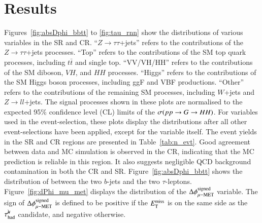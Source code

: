 

\section{Results}
    \label{sec:grav:res}
    Figures~\ref{fig:absDphi_bbtt} to \ref{fig:tau_rnn} show the distributions of various variables in the SR and CR. 
    ``$Z\rightarrow\tau\tau$+jets'' refers to the contributions of the $Z\rightarrow\tau\tau$+jets processes.
    ``Top'' refers to the contributions of the SM top quark processes, including $t\bar{t}$ and single top.
    ``VV/VH/HH'' refers to the contributions of the SM diboson, $VH$, and $HH$ processes.
    ``Higgs'' refers to the contributions of the SM Higgs boson processes, including ggF and VBF productions.
    ``Other'' refers to the contributions of the remaining SM processes, including $W$+jets and $Z\rightarrow ll$+jets.
    The signal processes shown in these plots are normalised to the expected 95\% confidence level (CL) limits of the $\sigma(pp\rightarrow G \rightarrow HH)$. 
    For variables used in the event-selection, these plots display the distributions after all other 
    event-selections have been applied, except for the variable itself. 
    The event yields in the SR and CR regions are presented in Table~\ref{tab:n_evt}. 
    Good agreement between data and MC simulation is observed in the CR, 
    indicating that the MC prediction is reliable in this region. 
    It also suggests negligible QCD background contamination in both the CR and SR.
    Figure~\ref{fig:absDphi_bbtt} shows the distribution of \absdPhibbtt between the two $b$-jets and the two $\tau$-leptons. 
    Figure~\ref{fig:dPhi_mu_met} displays the distribution of the $\Delta\phi^\mathrm{signed}_\mathrm{\mu-MET}$ variable. 
    The sign of $\Delta\phi^\mathrm{signed}_\mathrm{\mu-MET}$ is defined to be positive if the $E_{\text{T}}^{\text{miss}}$ is on the same side as the $\tau_\mathrm{had}^{\mu\mkern-10mu\backslash}$ candidate, and negative otherwise. 

